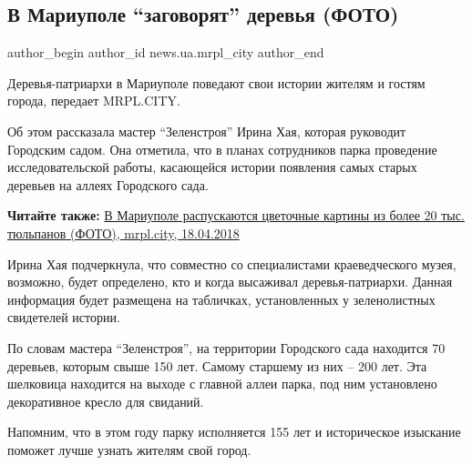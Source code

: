  
 
 
 
 
 
\subsection{В Мариуполе \enquote{заговорят} деревья (ФОТО)}
\label{sec:19_04_2018.stz.news.ua.mrpl_city.1.v_mariupole_zagovorjat_derevja}
 
\ifcmt
 author_begin
   author_id news.ua.mrpl_city
 author_end
\fi


Деревья-патриархи в Мариуполе поведают свои истории жителям и гостям города,
передает MRPL.CITY.

Об этом рассказала мастер \enquote{Зеленстроя} Ирина Хая, которая руководит Городским
садом. Она отметила, что в планах сотрудников парка проведение
исследовательской работы, касающейся истории появления самых старых деревьев на
аллеях Городского сада.


\textbf{Читайте также:} \href{https://archive.org/details/18_04_2018.mrpl_city.kartiny_tulpany}{%
В Мариуполе распускаются цветочные картины из более 20 тыс. тюльпанов (ФОТО), mrpl.city, 18.04.2018}

Ирина Хая подчеркнула, что совместно со специалистами краеведческого музея,
возможно, будет определено, кто и когда высаживал деревья-патриархи. Данная
информация будет размещена на табличках, установленных у зеленолистных
свидетелей истории.


По словам мастера \enquote{Зеленстроя}, на территории Городского сада находится 70
деревьев, которым свыше 150 лет. Самому старшему из них – 200 лет. Эта
шелковица находится на выходе с главной аллеи парка, под ним установлено
декоративное кресло для свиданий.

Напомним, что в этом году парку исполняется 155 лет и историческое изыскание
поможет лучше узнать жителям  свой город.

